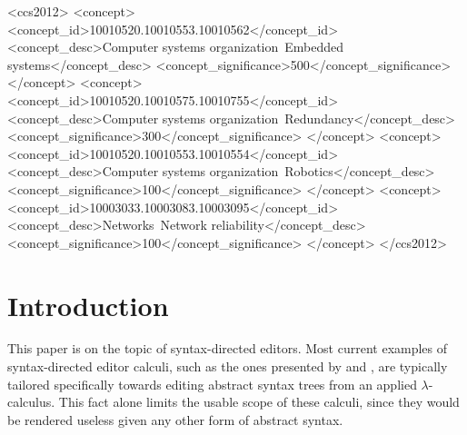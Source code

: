\documentclass[sigplan,screen]{acmart}
\begin{document}
\begin{CCSXML}
<ccs2012>
 <concept>
  <concept_id>10010520.10010553.10010562</concept_id>
  <concept_desc>Computer systems organization~Embedded systems</concept_desc>
  <concept_significance>500</concept_significance>
 </concept>
 <concept>
  <concept_id>10010520.10010575.10010755</concept_id>
  <concept_desc>Computer systems organization~Redundancy</concept_desc>
  <concept_significance>300</concept_significance>
 </concept>
 <concept>
  <concept_id>10010520.10010553.10010554</concept_id>
  <concept_desc>Computer systems organization~Robotics</concept_desc>
  <concept_significance>100</concept_significance>
 </concept>
 <concept>
  <concept_id>10003033.10003083.10003095</concept_id>
  <concept_desc>Networks~Network reliability</concept_desc>
  <concept_significance>100</concept_significance>
 </concept>
</ccs2012>
\end{CCSXML}




\maketitle

\section{Introduction}
This paper is on the topic of syntax-directed editors. 
Most current examples of syntax-directed editor calculi, such as the ones presented by \cite{hazelnut} and \cite{type_safe_structure_editor}, are typically tailored specifically towards editing abstract syntax trees from an applied $\lambda$-calculus. 
This fact alone limits the usable scope of these calculi, since they would be rendered useless given any other form of abstract syntax. 
\end{document}

